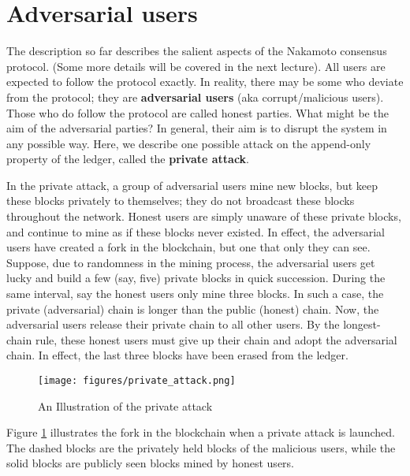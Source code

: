 \documentclass{article}
\begin{document}
\section*{Adversarial users}
The description so far describes the salient aspects of the  Nakamoto consensus protocol. (Some more details will be covered in the next  lecture). All users are expected to follow the protocol exactly. In reality, there may be some who deviate from the protocol; they are \textbf{adversarial users} (aka corrupt/malicious users). Those who do follow the protocol are called honest parties. What might be the aim of the adversarial parties? In general, their aim is to disrupt the system in any possible way. Here, we describe one possible attack on the append-only property of the ledger, called the \textbf{private attack}.

In the private attack, a group of adversarial users mine new blocks, but keep these blocks privately to themselves; they do not broadcast these blocks throughout the network. Honest users are simply unaware of these private blocks, and continue to mine as if these blocks never existed. In effect, the adversarial users have created a fork in the blockchain, but one that only they can see. Suppose, due to randomness in the mining process, the adversarial users get lucky and build a few (say, five) private blocks in quick succession. During the same interval, say the honest users only mine three blocks. In such a case, the private (adversarial) chain is longer than the public (honest) chain. Now, the adversarial users release their private chain to all other users. By the longest-chain rule, these honest users must give up their chain and adopt the adversarial chain. In effect, the last three blocks have been erased from the ledger.

\begin{figure}[htbp]
    \centering
    \texttt{[image: figures/private\_attack.png]}
    \caption{An Illustration of the private attack}
    \label{fig:private_attack}
\end{figure}

Figure \ref{fig:private_attack} illustrates the fork in the blockchain when a private attack is launched. The dashed blocks are the privately held blocks of the malicious users, while the solid blocks are publicly seen blocks mined by honest users. 
\end{document}
